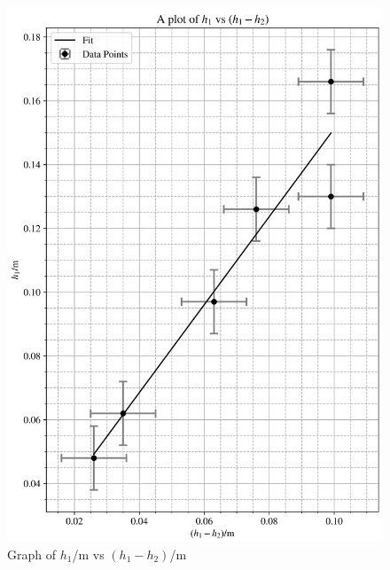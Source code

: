 \documentclass[12pt, a4paper]{article}
\begin{document}
\begin{figure}
    \centering
    \includegraphics[width=\textwidth]{h1vsd.png}
    \caption{Graph of $h_1$/m vs $(h_1-h_2)$/m}
    \label{fig:Graph 1}
\end{figure}
\end{document}
